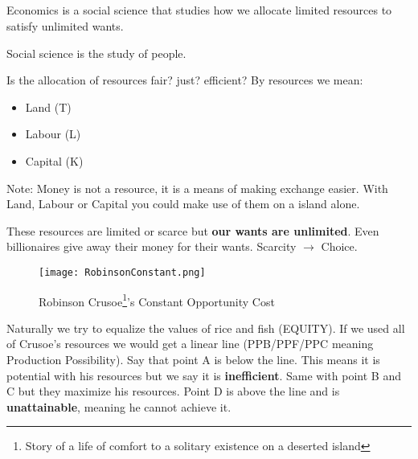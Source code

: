 
\subsection{}
\begin{definition}
    Economics is a social science that studies how we allocate limited resources
    to satisfy unlimited wants.
\end{definition}
\begin{definition}
    Social science is the study of people.
\end{definition}
Is the allocation of resources fair? just? efficient?
By resources we mean:
\begin{itemize}
    \item Land (T)
    \item Labour (L)
    \item Capital (K) 
\end{itemize}
Note: Money is not a resource, it is a means of making exchange easier.
With Land, Labour or Capital you could make use of them on a island alone.

These resources are limited or scarce but \textbf{our wants are unlimited}. Even billionaires give away their money for their wants.
Scarcity $\rightarrow$ Choice.
\newpage
\begin{figure}[h!]
    \begin{minipage}{\textwidth}
        \centering
        \texttt{[image: RobinsonConstant.png]}
        \caption[Constant Opportunity Cost]{Robinson Crusoe\footnote[1]{Story of a life of comfort to a solitary existence on a deserted island}'s Constant Opportunity Cost}
    \end{minipage}
\end{figure}
\begin{center}
\end{center}
Naturally we try to equalize the values of rice and fish (EQUITY).
If we used all of Crusoe's resources we would get a linear line (PPB/PPF/PPC meaning Production Possibility). Say that point A is below the line. This means it is potential with his resources but we say it is \textbf{inefficient}.
Same with point B and C but they maximize his resources. Point D is above the line and is \textbf{unattainable}, meaning he cannot achieve it.

